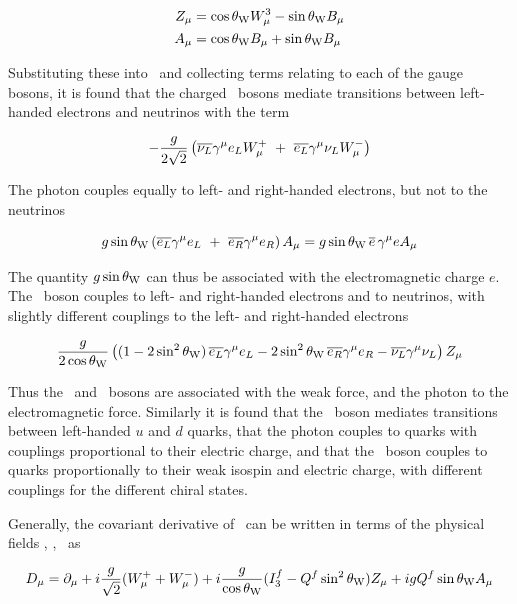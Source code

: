 \begin{align}
Z_{\mu} & = \cos{\ensuremath{\theta_{\mathrm{W}}}} W^{3}_{\mu} - \sin{\ensuremath{\theta_{\mathrm{W}}}} B_{\mu} \\
A_{\mu} & = \cos{\ensuremath{\theta_{\mathrm{W}}}} B_{\mu} + \sin{\ensuremath{\theta_{\mathrm{W}}}} B_{\mu}
\end{align}

Substituting these into~ and collecting terms
relating to each of the gauge bosons, it is found that the
charged \Wpm\ bosons mediate transitions between left-handed electrons and
neutrinos with the term

\begin{equation}
- \frac{g}{2\sqrt{2}} \left( \overline{\nu_{L}} \gamma^{\mu} e_{L} W^{+}_{\mu}
\ + \  \overline{e_{L}} \gamma^{\mu} \nu_{L} W^{-}_{\mu} \right)
\end{equation}

The photon couples equally to left- and right-handed electrons, but not to the
neutrinos

\begin{equation}
g \sin{\ensuremath{\theta_{\mathrm{W}}}} \left( \overline{e_{L}} \gamma^{\mu} e_{L} 
\ + \ \overline{e_{R}} \gamma^{\mu} e_{R} \right) A_{\mu}
 = g \sin{\ensuremath{\theta_{\mathrm{W}}}} \, \overline{e}\, \gamma^{\mu} e A_{\mu}
\end{equation}

The quantity $g \sin{\ensuremath{\theta_{\mathrm{W}}}}$ can thus be associated with the electromagnetic
charge $e$. The \Z\ boson couples to left- and right-handed electrons and to
neutrinos, with slightly different couplings to the left- and right-handed
electrons

\begin{equation}
\frac{g}{2 \cos{\ensuremath{\theta_{\mathrm{W}}}}} \left( 
(1 - 2 \sin^{2}{\theta_{\mathrm{W}}})\, \overline{e_{L}} \gamma^{\mu} e_{L}  - 2 \sin^{2}{\theta_{\mathrm{W}}}\, \overline{e_{R}} \gamma^{\mu} e_{R} 
- \overline{\nu_{L}} \gamma^{\mu} \nu_{L} 
\right)Z_{\mu}
\end{equation}

Thus the \W\ and \Z\ bosons are associated with the weak force, and the photon
to the electromagnetic force. Similarly it is found that the \W\ boson mediates
transitions between left-handed $u$ and $d$ quarks, that the photon couples to
quarks with couplings proportional to their electric charge, and that the
\Z\ boson couples to quarks proportionally to their weak isospin and electric
charge, with different couplings for the different chiral states.

Generally, the covariant derivative of~ can be
written in terms of the physical fields \Wpmmu, \Zmu, \Amu\ as

\begin{equation}
D_{\mu}  =  \partial_{\mu} + i \frac{g}{\sqrt{2}} ( W^{+}_{\mu} + W^{-}_{\mu} ) 
+ i \frac{g}{\cos{\ensuremath{\theta_{\mathrm{W}}}}} ( I^{f}_{3} - Q^{f} \sin^{2}{\theta_{\mathrm{W}}} ) Z_{\mu}
+ i g Q^{f} \sin{\ensuremath{\theta_{\mathrm{W}}}} A_{\mu}
\label{eqn:ew-covariant-derivative-full}
\end{equation}

